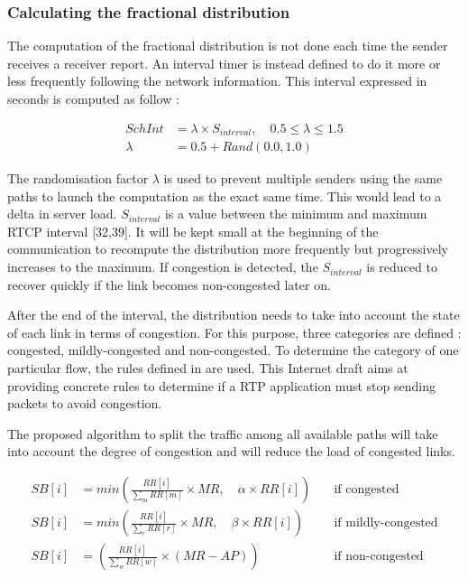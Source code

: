 \subsubsection{Calculating the fractional distribution}

The computation of the fractional distribution is not done each time the sender receives a receiver report. An interval timer is instead defined to do it more or less frequently following the network information. This interval expressed in seconds is computed as follow : 

\begin{equation*}
\begin{split}
SchInt & = \lambda \times S_{interval},\quad 0.5 \le \lambda \le 1.5 \\
 \lambda & = 0.5 + Rand(0.0,1.0)
\end{split}
\end{equation*}

The randomisation factor $\lambda$ is used to prevent multiple senders using the same paths to launch the computation as the exact same time. This would lead to a delta in server load. $S_{interval}$ is a value between the minimum and maximum RTCP interval [32,39]. It will be kept small at the beginning of the communication to recompute the distribution more frequently but progressively increases to the maximum. If congestion is detected, the $S_{interval}$ is reduced to recover quickly if the link becomes non-congested later on.

After the end of the interval, the distribution needs to take into account the state of each link in terms of congestion. For this purpose, three categories are defined : congested, mildly-congested and non-congested. To determine the category of one particular flow, the rules defined in \cite{ietf-avtcore-rtp-circuit-breakers} are used. This Internet draft aims at providing concrete rules to determine if a RTP application must stop sending packets to avoid congestion.

The proposed algorithm to split the traffic among all available paths will take into account the degree of congestion and will reduce the load of congested links.

\begin{align*}
SB[i] & = min\left( \frac{RR[i]}{\sum_{m} RR[m]} \times MR,\quad \alpha \times RR[i] \right) &\quad \text{if congested} \\
SB[i] & = min\left( \frac{RR[i]}{\sum_{r} RR[r]} \times MR,\quad \beta \times RR[i] \right) &\quad \text{if mildly-congested} \\
SB[i] & = \left( \frac{RR[i]}{\sum_{w} RR[w]} \times (MR - AP) \right) & \quad \text{if non-congested}
\end{align*}

